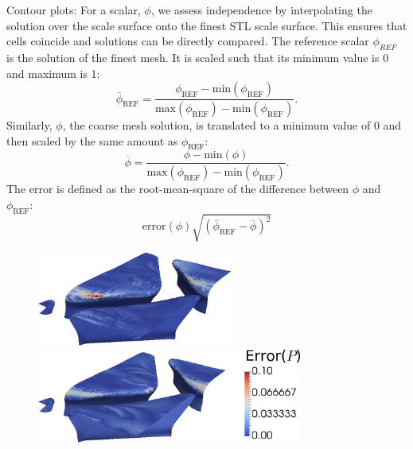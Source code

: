 \documentclass[12pt,oneside,a4paper]{article}
\begin{document}
Contour plots:
For a scalar, $\phi$, we assess independence by interpolating the solution over the scale surface onto the finest STL scale surface. This ensures that cells coincide and solutions can be directly compared. The reference scalar $\phi_{REF}$ is the solution of the finest mesh. It is scaled such that its minimum value is 0 and maximum is 1:
\begin{equation}
\overline{\phi}_{\text{REF}} = \frac{\phi_{\text{REF}}-\text{min}(\phi_{\text{REF}})}{\text{max}(\phi_{\text{REF}})-\text{min}(\phi_{\text{REF}})}.
\end{equation}
Similarly, $\phi$, the coarse mesh solution, is translated to a minimum value of 0 and then scaled by the same amount as $\phi_{\text{REF}}$:
\begin{equation}
\overline{\phi} = \frac{\phi-\text{min}(\phi)}{\text{max}(\phi_{\text{REF}})-\text{min}(\phi_{\text{REF}})}.
\end{equation}
The error is defined as the root-mean-square of the difference between $\phi$ and $\phi_{\text{REF}}$:
\begin{equation}
\text{error}(\phi)\sqrt{(\overline{\phi}_{\text{REF}} - \overline{\phi})^2}
\end{equation}


\begin{figure}
\centering
\includegraphics[height=3.1cm]{images/CFD_meshIndependence/tc3_p.png}\hfill \includegraphics[height=3.1cm]{images/CFD_meshIndependence/tc5_p_bar.png}
\end{figure}
\end{document}
